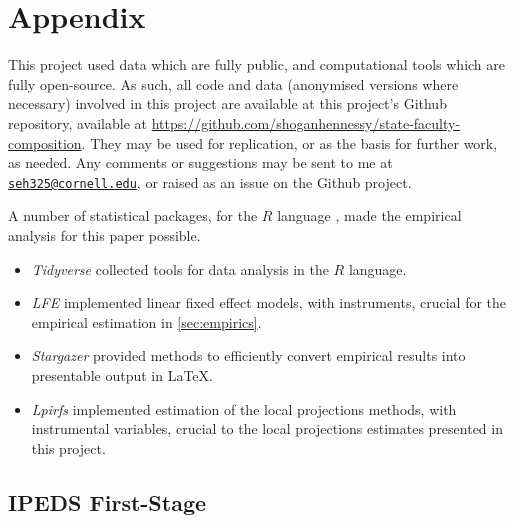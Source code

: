 \newpage
\appendix
\setcounter{table}{0}
\renewcommand{\thetable}{A\arabic{table}}
\setcounter{figure}{0}
\renewcommand{\thefigure}{A\arabic{figure}}

\section{Appendix}
\label{appendix}
This project used data which are fully public, and computational tools which are fully open-source.
As such, all code and data (anonymised versions where necessary) involved in this project are available at this project's Github repository, available at \url{https://github.com/shoganhennessy/state-faculty-composition}.
They may be used for replication, or as the basis for further work, as needed.
Any comments or suggestions may be sent to me at \href{mailto:seh325@cornell.edu}{\nolinkurl{seh325@cornell.edu}}, or raised as an issue on the Github project.

A number of statistical packages, for the $R$ language \citep{R2022}, made the empirical analysis for this paper possible.
\begin{itemize}
    \item \textit{Tidyverse} \citep{tidyverse} collected tools for data analysis in the $R$ language.
    \item \textit{LFE} \citep{lfe} implemented linear fixed effect models, with instruments, crucial for the empirical estimation in \autoref{sec:empirics}.
    \item \textit{Stargazer} \citep{stargazer} provided methods to efficiently convert empirical results into presentable output in \LaTeX.
    \item \textit{Lpirfs} \citep{lpirfs2019} implemented estimation of the \cite{jorda2005} local projections methods, with instrumental variables, crucial to the local projections estimates presented in this project.
\end{itemize}

\subsection{IPEDS First-Stage}
\label{sec:appendix-ipeds-firststage}

